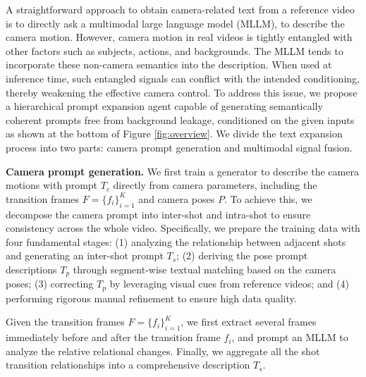 \documentclass[letterpaper]{article} %
\begin{document}
A straightforward approach to obtain camera-related text from a reference video is to directly ask a multimodal large language model  (MLLM), to describe the camera motion. However, camera motion in real videos is tightly entangled with other factors such as subjects, actions, and backgrounds. The MLLM tends to incorporate these non-camera semantics into the description. When used at inference time, such entangled signals can conflict with the intended conditioning, thereby weakening the effective camera control. To address this issue, we propose a hierarchical prompt expansion agent capable of generating semantically coherent prompts free from background leakage, conditioned on the given inputs as shown at the bottom of Figure \ref{fig:overview}. We divide the text expansion process into two parts: camera prompt generation and multimodal signal fusion.

\textbf{Camera prompt generation.} We first train a generator to describe the camera motions with prompt $T_c$ directly from camera parameters, including the transition frames $F=\{f_i\}_{i=1}^{K}$ and camera poses $P$. To achieve this, we decompose the camera prompt into inter-shot and intra-shot to ensure consistency across the whole video.  Specifically, we prepare the training data with four fundamental stages: (1) analyzing the relationship between adjacent shots and generating an inter-shot prompt $T_s$; (2) deriving the pose prompt descriptions $T_p$ through segment-wise textual matching based on the camera poses; (3) correcting $T_p$ by leveraging visual cues from reference videos; and (4) performing rigorous manual refinement to ensure high data quality.

Given the transition frames $F=\{f_i\}_{i=1}^{K}$, we first extract several frames immediately before and after the transition frame $f_i$, and prompt an MLLM to analyze the relative relational changes. Finally, we aggregate all the shot transition relationships into a comprehensive description $T_s$.
\end{document}
